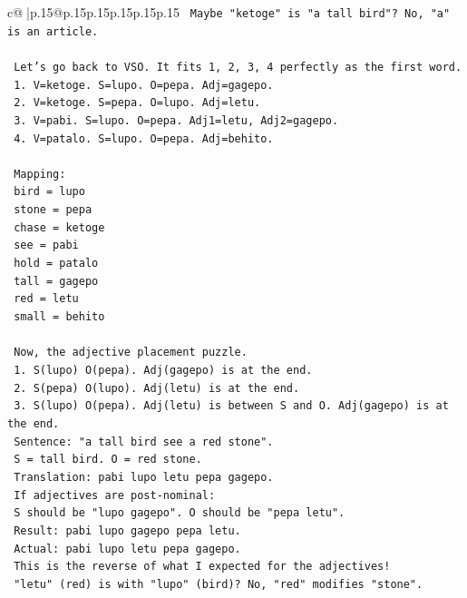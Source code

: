 \documentclass{article}
\begin{document}
{\begin{supertabular}{c@{$\;$}|p{.15\linewidth}@{}p{.15\linewidth}p{.15\linewidth}p{.15\linewidth}p{.15\linewidth}p{.15\linewidth}}
{{{\texttt{      Maybe "ketoge" is "a tall bird"? No, "a" is an article.} \\
\\ 
\texttt{   Let's go back to VSO. It fits 1, 2, 3, 4 perfectly as the first word.} \\
\texttt{   1. V=ketoge. S=lupo. O=pepa. Adj=gagepo.} \\
\texttt{   2. V=ketoge. S=pepa. O=lupo. Adj=letu.} \\
\texttt{   3. V=pabi. S=lupo. O=pepa. Adj1=letu, Adj2=gagepo.} \\
\texttt{   4. V=patalo. S=lupo. O=pepa. Adj=behito.} \\
\\ 
\texttt{   Mapping:} \\
\texttt{   bird = lupo} \\
\texttt{   stone = pepa} \\
\texttt{   chase = ketoge} \\
\texttt{   see = pabi} \\
\texttt{   hold = patalo} \\
\texttt{   tall = gagepo} \\
\texttt{   red = letu} \\
\texttt{   small = behito} \\
\\ 
\texttt{   Now, the adjective placement puzzle.} \\
\texttt{   1. S(lupo) O(pepa). Adj(gagepo) is at the end.} \\
\texttt{   2. S(pepa) O(lupo). Adj(letu) is at the end.} \\
\texttt{   3. S(lupo) O(pepa). Adj(letu) is between S and O. Adj(gagepo) is at the end.} \\
\texttt{      Sentence: "a tall bird see a red stone".} \\
\texttt{      S = tall bird. O = red stone.} \\
\texttt{      Translation: pabi lupo letu pepa gagepo.} \\
\texttt{      If adjectives are post{-}nominal:} \\
\texttt{      S should be "lupo gagepo". O should be "pepa letu".} \\
\texttt{      Result: pabi lupo gagepo pepa letu.} \\
\texttt{      Actual: pabi lupo letu pepa gagepo.} \\
\texttt{      This is the reverse of what I expected for the adjectives!} \\
\texttt{      "letu" (red) is with "lupo" (bird)? No, "red" modifies "stone".} \\
}}}
\end{supertabular}}
\end{document}
